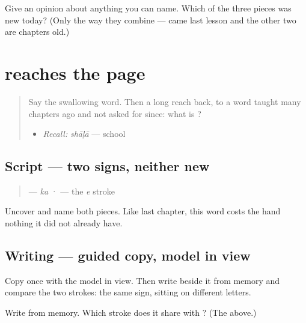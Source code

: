 \begin{tcolorbox}[breakable,colback=teal!4,colframe=teal!35!black,title={Before you move on}]
Give an opinion about anything you can name. Which of the three pieces was new today? (Only the way they combine — \textbf{} came last lesson and the other two are chapters old.)
\end{tcolorbox}
\section[\texorpdfstring{\gu{કે} (ke)}{કે (ke)}]{ reaches the page}

\label{lesson:GU-C33-ke-write}



\begin{quote}
Say the swallowing word. Then a long reach back, to a word taught many chapters ago and not asked for since: what is \textbf{}?

\begin{itemize}
\raggedright
  \item \emph{Recall:} \emph{shāḷā} — school
\end{itemize}
\end{quote}

\subsection*{Script — two signs, neither new}
\begin{quote}
\textbf{} — \emph{ka} · \textbf{} — the \emph{e} stroke
\end{quote}

Uncover \textbf{} and name both pieces. Like \textbf{} last chapter, this word costs the hand nothing it did not already have.

\subsection*{Writing — guided copy, model in view}

Copy \textbf{} once with the model in view. Then write \textbf{} beside it from memory and compare the two \textbf{} strokes: the same sign, sitting on different letters.

\begin{tcolorbox}[breakable,colback=teal!4,colframe=teal!35!black,title={Before you move on}]
Write \textbf{} from memory. Which stroke does it share with \textbf{}? (The \textbf{} above.)
\end{tcolorbox}
